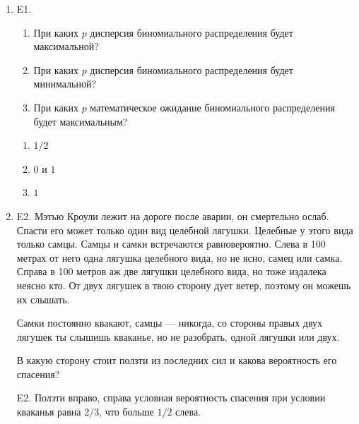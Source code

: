 \documentclass[12pt]{article}
\newenvironment{problem}{}{}
\newenvironment{sol}{}{} %
\begin{document}
\begin{enumerate}
\begin{problem}
\item[E1.]

\begin{enumerate}
\item При каких $p$ дисперсия биномиального распределения будет максимальной? 
\item При каких $p$ дисперсия биномиального распределения будет минимальной?
\item При каких $p$ математическое ожидание биномиального распределения будет максимальным?
\end{enumerate}


\begin{sol}
\begin{enumerate}
\item $1/2$
\item $0$ и $1$
\item $1$
\end{enumerate}
\end{sol}
\end{problem}

\begin{problem}
\item[E2.] Мэтью Кроули лежит на дороге после аварии, он смертельно ослаб. Спасти его может только один вид  целебной лягушки. Целебные у этого вида только самцы. Самцы и самки встречаются равновероятно. Слева в 100 метрах от него одна лягушка целебного вида, но не ясно, самец или самка. Справа в 100 метров аж две лягушки целебного вида, но тоже издалека неясно кто. От двух лягушек в твою сторону дует ветер, поэтому он можешь их слышать.

Самки постоянно квакают, самцы — никогда, со стороны правых двух лягушек ты слышишь кваканье, но не разобрать, одной лягушки или двух.

В какую сторону стоит ползти из последних сил и какова вероятность его спасения?

\begin{sol}
E2. Ползти вправо, справа условная вероятность спасения при условии кваканья равна $2/3$, что больше $1/2$ слева.
\end{sol}
\end{problem}


\end{enumerate}
\end{document}
